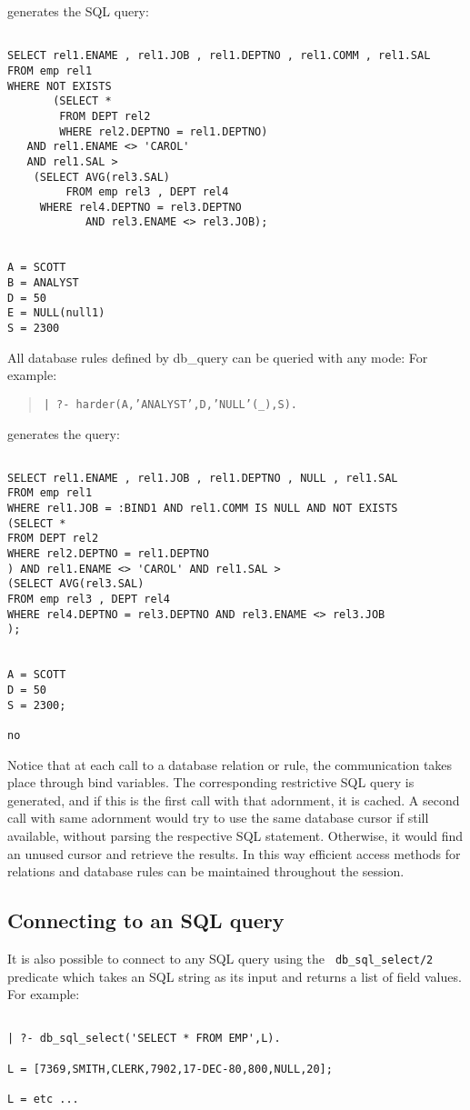 generates the SQL query:
\begin{verbatim}

SELECT rel1.ENAME , rel1.JOB , rel1.DEPTNO , rel1.COMM , rel1.SAL
FROM emp rel1
WHERE NOT EXISTS
       (SELECT * 
        FROM DEPT rel2 
        WHERE rel2.DEPTNO = rel1.DEPTNO) 
   AND rel1.ENAME <> 'CAROL' 
   AND rel1.SAL > 
	(SELECT AVG(rel3.SAL) 
         FROM emp rel3 , DEPT rel4
	 WHERE rel4.DEPTNO = rel3.DEPTNO 
            AND rel3.ENAME <> rel3.JOB);


A = SCOTT
B = ANALYST
D = 50
E = NULL(null1)
S = 2300
\end{verbatim}

All database rules defined by db\_query can be queried with any mode:
For example:
\begin{quote}

{\tt | ?- harder(A,'ANALYST',D,'NULL'(\_),S).}
\end{quote}

generates the query:
\begin{verbatim}

SELECT rel1.ENAME , rel1.JOB , rel1.DEPTNO , NULL , rel1.SAL
FROM emp rel1
WHERE rel1.JOB = :BIND1 AND rel1.COMM IS NULL AND NOT EXISTS
(SELECT *
FROM DEPT rel2
WHERE rel2.DEPTNO = rel1.DEPTNO
) AND rel1.ENAME <> 'CAROL' AND rel1.SAL > 
(SELECT AVG(rel3.SAL)
FROM emp rel3 , DEPT rel4
WHERE rel4.DEPTNO = rel3.DEPTNO AND rel3.ENAME <> rel3.JOB
);


A = SCOTT
D = 50
S = 2300;

no
\end{verbatim}

Notice that at each call to a database relation or rule, the
communication takes place through bind variables.  The corresponding
restrictive SQL query is generated, and if this is the first call with
that adornment, it is cached.  A second call with same adornment would
try to use the same database cursor if still available, without
parsing the respective SQL statement.  Otherwise, it would find an
unused cursor and retrieve the results.  In this way efficient access
methods for relations and database rules can be maintained throughout
the session.

\subsection{Connecting to an SQL query}


It is also possible to connect to any SQL query using the {\tt
db\_sql\_select/2} predicate which takes an SQL string as its input and
returns a list of field values.  For example:
\begin{verbatim}

| ?- db_sql_select('SELECT * FROM EMP',L).

L = [7369,SMITH,CLERK,7902,17-DEC-80,800,NULL,20];

L = etc ...
\end{verbatim}

